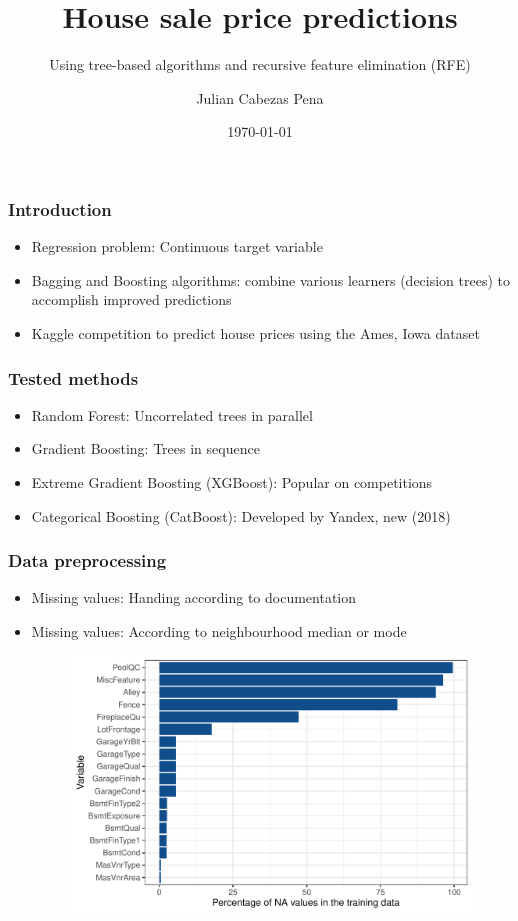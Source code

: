 \documentclass{beamer}
\title{House sale price predictions}
\subtitle{Using tree-based algorithms and recursive feature elimination (RFE)}
\author{Julian Cabezas Pena}
\institute{a1785086}
\date{\today}
\begin{document}
	
\begin{frame}
	\titlepage
\end{frame}	


\begin{frame}
	\frametitle{Introduction}
	
	\begin{itemize}
		\item Regression problem: Continuous target variable
		\item Bagging and Boosting algorithms: combine various learners (decision trees) to accomplish improved predictions
		\item Kaggle competition to predict house prices using the Ames, Iowa dataset
	\end{itemize}
	
\end{frame}


\begin{frame}
	\frametitle{Tested methods}
	
	\begin{itemize}
		\item Random Forest: Uncorrelated trees in parallel
		\item Gradient Boosting: Trees in sequence
		\item Extreme Gradient Boosting (XGBoost): Popular on competitions
		\item Categorical Boosting (CatBoost): Developed by Yandex, new (2018)
	\end{itemize}
	
\end{frame}


\begin{frame}
	\frametitle{Data preprocessing}
	
	\begin{itemize}
		\item Missing values: Handing according to documentation
		\item Missing values: According to neighbourhood median or mode
		
		\begin{figure}[H]
			\begin{center}
				\includegraphics[width=0.8\linewidth]{NA_plot.pdf}
			\end{center}
			\label{fig:log}
		\end{figure}
		
	\end{itemize}
	
\end{frame}
\end{document}
